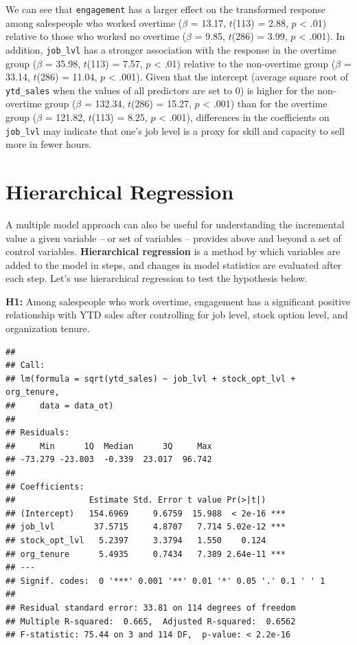 \documentclass[
]{book}
\begin{document}
We can see that \texttt{engagement} has a larger effect on the transformed response among salespeople who worked overtime (\(\beta\) = 13.17, \(t\)(113) = 2.88, \(p\) \textless{} .01) relative to those who worked no overtime (\(\beta\) = 9.85, \(t\)(286) = 3.99, \(p\) \textless{} .001). In addition, \texttt{job\_lvl} has a stronger association with the response in the overtime group (\(\beta\) = 35.98, \(t\)(113) = 7.57, \(p\) \textless{} .01) relative to the non-overtime group (\(\beta\) = 33.14, \(t\)(286) = 11.04, \(p\) \textless{} .001). Given that the intercept (average square root of \texttt{ytd\_sales} when the values of all predictors are set to 0) is higher for the non-overtime group (\(\beta\) = 132.34, \(t\)(286) = 15.27, \(p\) \textless{} .001) than for the overtime group (\(\beta\) = 121.82, \(t\)(113) = 8.25, \(p\) \textless{} .001), differences in the coefficients on \texttt{job\_lvl} may indicate that one's job level is a proxy for skill and capacity to sell more in fewer hours.

\hypertarget{hierarchical-regression}{%
\section{Hierarchical Regression}\label{hierarchical-regression}}

A multiple model approach can also be useful for understanding the incremental value a given variable -- or set of variables -- provides above and beyond a set of control variables. \textbf{Hierarchical regression} is a method by which variables are added to the model in steps, and changes in model statistics are evaluated after each step. Let's use hierarchical regression to test the hypothesis below.

\textbf{H1:} Among salespeople who work overtime, engagement has a significant positive relationship with YTD sales after controlling for job level, stock option level, and organization tenure.

\begin{verbatim}
## 
## Call:
## lm(formula = sqrt(ytd_sales) ~ job_lvl + stock_opt_lvl + org_tenure, 
##     data = data_ot)
## 
## Residuals:
##     Min      1Q  Median      3Q     Max 
## -73.279 -23.803  -0.339  23.017  96.742 
## 
## Coefficients:
##               Estimate Std. Error t value Pr(>|t|)    
## (Intercept)   154.6969     9.6759  15.988  < 2e-16 ***
## job_lvl        37.5715     4.8707   7.714 5.02e-12 ***
## stock_opt_lvl   5.2397     3.3794   1.550    0.124    
## org_tenure      5.4935     0.7434   7.389 2.64e-11 ***
## ---
## Signif. codes:  0 '***' 0.001 '**' 0.01 '*' 0.05 '.' 0.1 ' ' 1
## 
## Residual standard error: 33.81 on 114 degrees of freedom
## Multiple R-squared:  0.665,  Adjusted R-squared:  0.6562 
## F-statistic: 75.44 on 3 and 114 DF,  p-value: < 2.2e-16
\end{verbatim}
\end{document}

